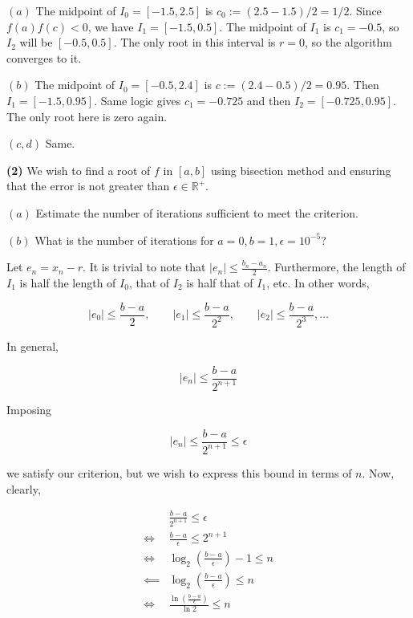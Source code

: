 \documentclass[12pt]{article}
\theoremstyle{definition}
\begin{document}
$(a)$ The midpoint of $I_0 = [-1.5, 2.5]$ is $c_0 := (2.5 - 1.5) / 2 = 1/2$. Since
$f(a)f(c) < 0$, we have $I_1 = [-1.5, 0.5]$. The midpoint of $I_1$ is $c_1 = -
0.5$, so $I_2$ will be $[-0.5, 0.5]$. The only root in this interval is $r = 0$,
so the algorithm converges to it.

$(b)$ The midpoint of $I_0 = [-0.5, 2.4]$ is $c := (2.4 - 0.5) / 2 = 0.95$. Then
$I_1 = [-1.5, 0.95]$. Same logic gives $c_1 = -0.725$ and then $I_2 = [-0.725,
0.95]$. The only root here is zero again. 

$(c, d)$ Same.

\pagebreak 

\begin{shaded}
    \textbf{(2)} We wish to find a root of $f$ in $[a, b]$ using bisection
    method and ensuring that the error is not greater than $\epsilon \in
    \mathbb{R}^+$. 

    $(a)$ Estimate the number of iterations sufficient to meet the criterion. 

    $(b)$ What is the number of iterations for $a = 0, b = 1, \epsilon =
    10^{-5}$? 
\end{shaded}

Let $e_n = x_n - r$. It is trivial to note that $\left| e_n \right| \leq
\frac{b_n - a_n}{2}$. Furthermore, the length of $I_1$ is half the length of
$I_0$, that of $I_2$ is half that of $I_1$, etc. In other words, 

\begin{equation*}
    \left| e_0 \right|  \leq \frac{b-a}{2}, \qquad \left| e_1 \right|  \leq
    \frac{b-a}{2^2}, \qquad \left| e_2 \right|  \leq
    \frac{b-a}{2^3}, \ldots
\end{equation*}

In general, 

\begin{equation*}
    \left| e_n \right|  \leq \frac{b-a}{2^{n+1}}
\end{equation*}

Imposing

\begin{equation*}
    \left| e_n \right|  \leq \frac{b-a}{2^{n+1}} \leq \epsilon
\end{equation*}

we satisfy our criterion, but we wish to express this bound in terms of $n$.
Now, clearly, 

\begin{align*}
&\frac{b-a}{2^{n+1}} \leq \epsilon  \\
\iff&\frac{ b-a }{\epsilon} \leq  2^{n+1} \\ 
\iff& \log_2\left( \frac{ b-a }{\epsilon} \right)  - 1 \leq n  \\
\impliedby& \log_2\left( \frac{b-a}{\epsilon} \right)  \leq n\\ 
\iff&\frac{ \ln \left( \frac{b-a}{\epsilon} \right)  }{\ln 2} \leq n
\end{align*}
\end{document}
